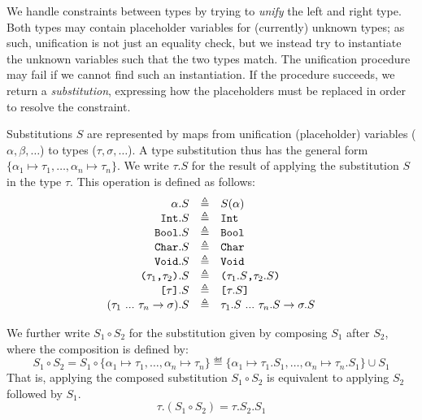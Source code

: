 We handle constraints between types by trying to \emph{unify} the left and right
type. Both types may contain placeholder variables for (currently) unknown
types; as such, unification is not just an equality check, but we instead try to
instantiate the unknown variables such that the two types match.
The unification procedure may fail if we cannot find such an instantiation.
If the procedure succeeds, we return a \emph{substitution}, expressing how the
placeholders must be replaced in order to resolve the constraint.

Substitutions $S$ are represented by maps from unification (placeholder)
variables ($\alpha,\beta,\dots$) to types ($\tau,\sigma,\dots$). A type
substitution thus has the general form
$\{ \alpha_1 \mapsto \tau_1, \dots, \alpha_n \mapsto \tau_n \}$.
We write $\tau.S$ for the result of applying the substitution $S$ in the type
$\tau$. This operation is defined as follows:
%
\[
\begin{array}{rcl}
  \alpha.S & \triangleq & S(\alpha) \\
  \texttt{Int}.S & \triangleq & \texttt{Int} \\
  \texttt{Bool}.S & \triangleq & \texttt{Bool} \\
  \texttt{Char}.S & \triangleq & \texttt{Char} \\
  \texttt{Void}.S & \triangleq & \texttt{Void} \\
  \texttt{(}\tau_1\texttt{,}\tau_2\texttt{)}.S & \triangleq & \texttt{(}\tau_1.S\texttt{,}\tau_2.S\texttt{)} \\
  \texttt{[}\tau\texttt{]}.S & \triangleq & \texttt{[}\tau.S\texttt{]} \\
  (\tau_1\ ...\ \tau_n \to \sigma).S & \triangleq & \tau_1.S\ ...\ \tau_n.S \to \sigma.S
\end{array}
\]

We further write $S_1 \circ S_2$ for the substitution given by composing $S_1$
after $S_2$, where the composition is defined by:
\[ S_1 \circ S_2 =
    S_1 \circ \{ \alpha_1 \mapsto \tau_1, \dots, \alpha_n \mapsto \tau_n \} \eqdef
    \{ \alpha_1 \mapsto \tau_1.S_1, \dots, \alpha_n \mapsto \tau_n.S_1 \} \cup S_1 \]
%
That is, applying the composed substitution $S_1 \circ S_2$ is equivalent to
applying $S_2$ followed by $S_1$.
\[ \tau.(S_1 \circ S_2) = \tau.S_2.S_1 \]


